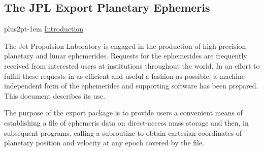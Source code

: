 \documentclass[twoside,11pt]{article}
\renewcommand{\_}{\texttt{\symbol{95}}}
\newcommand{\hdg}[1]{\vskip4pt plus2pt\leavevmode\kern-1em \underline{\large{#1}}\par}
\newcommand{\hdg}[1]{\subsection*{{#1}}}
\begin{document}


\setlength{\parindent}{0pt}
\setlength{\parskip}{8pt}
\setlength{\baselineskip}{11pt}


\begin{center}
\section*{The JPL Export Planetary Ephemeris}
\end{center}

\hdg{Introduction}

The Jet Propulsion Laboratory is engaged in the production of
high-precision planetary and lunar ephemerides. Requests
for the ephemerides are frequently received
from interested users at institutions throughout the world.
In an effort to fulfill these requests in as efficient and
useful a fashion as possible, a machine-independent form of the
ephemerides and supporting software has been prepared.
This document describes its use.
 
The purpose of the export package is to provide users a convenient
means of establishing a file of ephemeris data on direct-access
mass storage and then, in subsequent programs,
calling a subroutine to obtain cartesian
coordinates of planetary position and velocity at any epoch covered
by the file.
 
\end{document}
